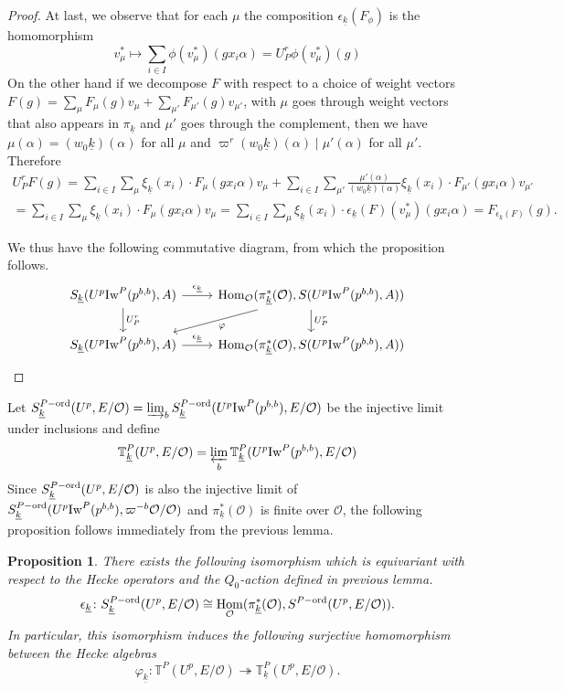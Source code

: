 \documentclass[leqno]{amsart}
\newtheorem{prop}[thm]{Proposition}
\theoremstyle{definition}
\theoremstyle{remark}
\newcommand{\oo}{\mathcal{O}}
\DeclareMathOperator{\Hom}{Hom}
\newcommand{\wt}[1]{\underline{ #1 }}
\newcommand{\Iw}{\textnormal{Iw}} %
\newcommand{\TT}{\mathbb{T}} %
\newcommand{\ord}{\textnormal{ord}} %
\begin{document}
\begin{proof}
	At last, we observe that for each $\mu$ 
	the composition
	$\epsilon_{\wt{k}}(F_\phi)$ is the homomorphism
	\[
		v_\mu^*\mapsto \sum_{i\in I}\phi(v_\mu^*)
		(gx_i\alpha) =U_P^r\phi(v_\mu^*)(g)
	\]
	On the other hand 
	if we decompose $F$ with respect to a choice of 
	weight vectors
	$F(g)=\sum_\mu F_\mu(g)v_\mu+
	\sum_{\mu'}F_{\mu'}(g)v_{\mu'}$, 
	with $\mu$ goes through weight vectors 
	that also appears in $\pi_{\wt{k}}$
	and $\mu'$ goes through the complement,
	then we have
	$\mu(\alpha)=(w_0\wt{k})(\alpha)$ for all $\mu$
	and  $\varpi^r(w_0\wt{k})(\alpha)\mid \mu'(\alpha)$
	for all $\mu'$.
	Therefore
	\begin{multline*}
	U_P^rF(g)=
	\sum_{i\in I}
	\sum_\mu \xi_{\wt{k}}(x_i)\cdot F_\mu(gx_i\alpha)v_\mu+
	\sum_{i\in I}
	\sum_{\mu'}\frac{\mu'(\alpha)}{(w_0\wt{k})(\alpha)}
	\xi_{\wt{k}}(x_i)\cdot F_{\mu'}(gx_i\alpha)v_{\mu'}\\=
	\sum_{i\in I}
	\sum_\mu \xi_{\wt{k}}(x_i)\cdot F_\mu(gx_i\alpha)v_\mu=
	\sum_{i\in I}
	\sum_\mu \xi_{\wt{k}}(x_i)\cdot
	\epsilon_{\wt{k}}(F)(v^*_\mu)(gx_i\alpha)
	=F_{\epsilon_{\wt{k}}(F)}(g).
	\end{multline*}

	We thus have the following commutative diagram,
	from which the proposition follows.
	\[
	\begin{tikzcd}
		S_{\wt{k}}(U^p\Iw^P(p^{b,b}),A)
		\arrow[r,"\epsilon_{\wt{k}}"]
		\arrow[d,"U_P^r"]
		& \Hom_\oo(\pi^*_{\wt{k}}(\oo), S(U^p\Iw^P(p^{b,b}),A))
		\arrow[d,"U_P^r"]
		\arrow[dl,"\varphi"]\\
		S_{\wt{k}}(U^p\Iw^P(p^{b,b}),A)
		\arrow[r,"\epsilon_{\wt{k}}"]
		& \Hom_\oo(\pi^*_{\wt{k}}(\oo), S(U^p\Iw^P(p^{b,b}),A))
	\end{tikzcd}	
	\]
\end{proof}


Let $S_{\wt{k}}^{P-\ord}(U^p,E/\oo)=
\varinjlim_{b}
S_{\wt{k}}^{P-\ord}(U^p\Iw^P(p^{b,b}),E/\oo)$
be the injective limit under inclusions
and define 
\[
	\TT^P_{\wt{k}}(U^p,E/\oo)=
	\varprojlim_{b}
	\TT^P_{\wt{k}}(U^p\Iw^P(p^{b,b}),E/\oo)
\]
Since $S_{\wt{k}}^{P-\ord}(U^p,E/\oo)$
is also the injective limit of 
$S_{\wt{k}}^{P-\ord}(U^p\Iw^P(p^{b,b}),\varpi^{-b}\oo/\oo)$
and $\pi_{\wt{k}}^*(\oo)$ is finite over $\oo$,
the following proposition
follows immediately from the previous lemma.

\begin{prop}\label{prop:wt_indep}
	There exists the following isomorphism
	which is equivariant with respect to the 
	Hecke operators and the $Q_0$-action 
	defined in previous lemma.
	\[
		\epsilon_{\wt{k}} \colon 
		S_{\wt{k}}^{P-\ord}(U^p,E/\oo)\cong 
		\Hom_{\oo}(\pi_{\wt{k}}^*(\oo),
		S^{P-\ord}(U^p,E/\oo)).
	\]
	In particular, this isomorphism 
	induces the following surjective homomorphism
	between the Hecke algebras
	\[
		\varphi_{\wt{k}}\colon 
		\TT^P(U^p,E/\oo)\twoheadrightarrow
		\TT^P_{\wt{k}}(U^p,E/\oo).
	\]
\end{prop}
\end{document}
